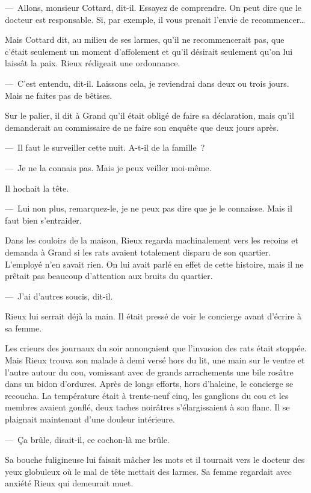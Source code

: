 \documentclass[french,twoside]{book} %
\begin{document}
— Allons, monsieur Cottard, dit-il. Essayez de comprendre. On peut dire que le docteur est responsable. Si, par exemple, il vous prenait l’envie de recommencer…\par
Mais Cottard dit, au milieu de ses larmes, qu’il ne recommencerait pas, que c’était seulement un moment d’affolement et qu’il désirait seulement qu’on lui laissât la paix. Rieux rédigeait une ordonnance.\par
— C’est entendu, dit-il. Laissons cela, je reviendrai dans deux ou trois jours. Mais ne faites pas de bêtises.\par
Sur le palier, il dit à Grand qu’il était obligé de faire sa déclaration, mais qu’il demanderait au commissaire de ne faire son enquête que deux jours après.\par
— Il faut le surveiller cette nuit. A-t-il de la famille ?\par
— Je ne la connais pas. Mais je peux veiller moi-même.\par
Il hochait la tête.\par
— Lui non plus, remarquez-le, je ne peux pas dire que je le connaisse. Mais il faut bien s’entraider.\par
Dans les couloirs de la maison, Rieux regarda machinalement vers les recoins et demanda à Grand si les rats avaient totalement disparu de son quartier. L’employé n’en savait rien. On lui avait parlé en effet de cette histoire, mais il ne prêtait pas beaucoup d’attention aux bruits du quartier.\par
— J’ai d’autres soucis, dit-il.\par
Rieux lui serrait déjà la main. Il était pressé de voir le concierge avant d’écrire à sa femme.\par
Les crieurs des journaux du soir annonçaient que l’invasion des rats était stoppée. Mais Rieux trouva son malade à demi versé hors du lit, une main sur le ventre et l’autre autour du cou, vomissant avec de grands arrachements une bile rosâtre dans un bidon d’ordures. Après de longs efforts, hors d’haleine, le concierge se recoucha. La température était à trente-neuf cinq, les ganglions du cou et les membres avaient gonflé, deux taches noirâtres s’élargissaient à son flanc. Il se plaignait maintenant d’une douleur intérieure.\par
— Ça brûle, disait-il, ce cochon-là me brûle.\par
Sa bouche fuligineuse lui faisait mâcher les mots et il tournait vers le docteur des yeux globuleux où le mal de tête mettait des larmes. Sa femme regardait avec anxiété Rieux qui demeurait muet.\par
\end{document}
